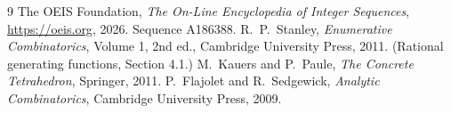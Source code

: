 \documentclass[11pt,a4paper]{article}
\theoremstyle{plain}
\theoremstyle{definition}
\begin{document}
\begin{thebibliography}{9}
 The OEIS Foundation, \emph{The On-Line Encyclopedia of Integer
Sequences}, \url{https://oeis.org}, 2026. Sequence A186388.
 R.~P.~Stanley, \emph{Enumerative Combinatorics}, Volume 1, 2nd ed.,
Cambridge University Press, 2011. (Rational generating functions, Section 4.1.)
 M.~Kauers and P.~Paule, \emph{The Concrete Tetrahedron}, Springer, 2011.
 P.~Flajolet and R.~Sedgewick, \emph{Analytic Combinatorics}, Cambridge
University Press, 2009.
\end{thebibliography}
\end{document}
